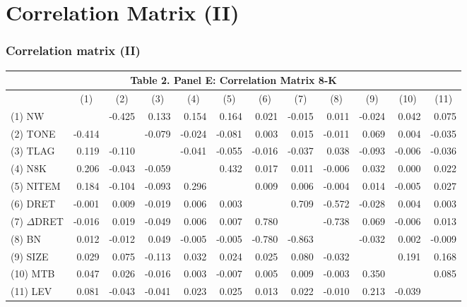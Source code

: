 \documentclass{beamer}
\begin{document}
\begin{frame}
\end{frame}



\section{Correlation Matrix (II)}
\begin{frame}
\frametitle{Correlation matrix (II)}
\begin{table}[H] \label{T2PE}
	\begin{center} \tiny
		\begin{tabular}{lrrrrrrrrrrr}
			\multicolumn{12}{c}{\textbf{Table 2. Panel E: Correlation Matrix 8-K}} \\
			\midrule
			\midrule
			& \multicolumn{1}{c}{(1)} & \multicolumn{1}{c}{(2)} & \multicolumn{1}{c}{(3)} & \multicolumn{1}{c}{(4)} & \multicolumn{1}{c}{(5)} & \multicolumn{1}{c}{(6)} & \multicolumn{1}{c}{(7)} & \multicolumn{1}{c}{(8)} & \multicolumn{1}{c}{(9)} & \multicolumn{1}{c}{(10)} & \multicolumn{1}{c}{(11)} \\
			\midrule
			(1) NW & & -0.425 & 0.133 & 0.154 & 0.164 & 0.021 & -0.015 & 0.011 & -0.024 & 0.042 & 0.075 \\
			(2) TONE & -0.414 &   & -0.079 & -0.024 & -0.081 & 0.003 & 0.015 & -0.011 & 0.069 & 0.004 & -0.035 \\
			(3) TLAG & 0.119 & -0.110 &   & -0.041 & -0.055 & -0.016 & -0.037 & 0.038 & -0.093 & -0.006 & -0.036 \\
			(4) N8K & 0.206 & -0.043 & -0.059 &   & 0.432 & 0.017 & 0.011 & -0.006 & 0.032 & 0.000 & 0.022 \\
			(5) NITEM & 0.184 & -0.104 & -0.093 & 0.296 &   & 0.009 & 0.006 & -0.004 & 0.014 & -0.005 & 0.027 \\
			(6) DRET & -0.001 & 0.009 & -0.019 & 0.006 & 0.003 &   & 0.709 & -0.572 & -0.028 & 0.004 & 0.003 \\
			(7) $\Delta$DRET & -0.016 & 0.019 & -0.049 & 0.006 & 0.007 & 0.780 &   & -0.738 & 0.069 & -0.006 & 0.013 \\
			(8) BN & 0.012 & -0.012 & 0.049 & -0.005 & -0.005 & -0.780 & -0.863 &   & -0.032 & 0.002 & -0.009 \\
			(9) SIZE & 0.029 & 0.075 & -0.113 & 0.032 & 0.024 & 0.025 & 0.080 & -0.032 &   & 0.191 & 0.168 \\
			(10) MTB & 0.047 & 0.026 & -0.016 & 0.003 & -0.007 & 0.005 & 0.009 & -0.003 & 0.350 &   & 0.085 \\
			(11) LEV & 0.081 & -0.043 & -0.041 & 0.023 & 0.025 & 0.013 & 0.022 & -0.010 & 0.213 & -0.039 &  \\
			\bottomrule
			\bottomrule
		\end{tabular}%
	\end{center}

\end{table}%


\end{frame}
\end{document}
